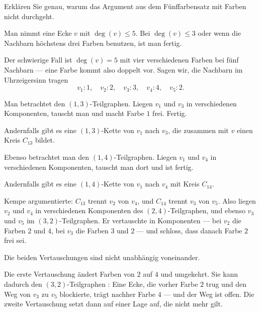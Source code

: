 \begin{aufgabe}
Erklären Sie genau, warum das Argument aus dem Fünffarbensatz mit  Farben nicht durchgeht.

\loesung
{}
Man nimmt eine Ecke $v$ mit $\deg(v) \le 5$. Bei $\deg(v) \le 3$ oder wenn die Nachbarn höchstens drei Farben benutzen, ist man fertig.

Der schwierige Fall ist $\deg(v) = 5$ mit vier verschiedenen Farben bei fünf Nachbarn --- eine Farbe kommt also doppelt vor. Sagen wir, die Nachbarn im Uhrzeigersinn tragen
\[ v_1: 1, \quad v_2: 2, \quad v_3: 3, \quad v_4: 4, \quad v_5: 2 . \]

Man betrachtet den $(1,3)$-Teilgraphen. Liegen $v_1$ und $v_3$ in verschiedenen Komponenten, tauscht man und macht Farbe $1$ frei. Fertig.

Andernfalls gibt es eine $(1,3)$-Kette von $v_1$ nach $v_3$, die zusammen mit $v$ einen Kreis $C_{13}$ bildet.

Ebenso betrachtet man den $(1,4)$-Teilgraphen. Liegen $v_1$ und $v_4$ in verschiedenen Komponenten, tauscht man dort und ist fertig.

Andernfalls gibt es eine $(1,4)$-Kette von $v_1$ nach $v_4$ mit Kreis $C_{14}$.

Kempe argumentierte: $C_{13}$ trennt $v_2$ von $v_4$, und $C_{14}$ trennt $v_3$ von $v_5$. Also liegen $v_2$ und $v_4$ in verschiedenen Komponenten des $(2,4)$-Teilgraphen, und ebenso $v_3$ und $v_5$ im $(3,2)$-Teilgraphen. Er vertauschte in  Komponenten --- bei $v_2$ die Farben $2$ und $4$, bei $v_3$ die Farben $3$ und $2$ --- und schloss, dass danach Farbe $2$ frei sei.

Die beiden Vertauschungen sind nicht unabhängig voneinander.

Die erste Vertauschung ändert Farben von $2$ auf $4$ und umgekehrt. Sie kann dadurch den $(3,2)$-Teilgraphen : Eine Ecke, die vorher Farbe $2$ trug und den Weg von $v_3$ zu $v_5$ blockierte, trägt nachher Farbe $4$ --- und der Weg ist offen. Die zweite Vertauschung setzt dann auf einer Lage auf, die nicht mehr gilt.

\begin{center}
\begin{minipage}{0.88\textwidth}
\end{minipage}
\end{center}


\end{aufgabe}
